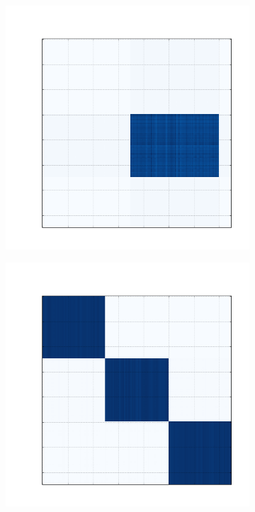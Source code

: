 \documentclass[
    12pt,                %
    oneside,            %
    a4paper,            %
    english,            %
    brazil                %
    ]{abntex2ppgsi}
\begin{document}
\begin{figure}[H]
    \begin{subfigure}[b]{0.18\textwidth}
        \includegraphics[width=\textwidth]{img/a-reconstruction-ovnmtf.png}
        \caption{}
    \end{subfigure}
    \begin{subfigure}[b]{0.18\textwidth}
        \includegraphics[width=\textwidth]{img/b-reconstruction-ovnmtf.png}

\end{subfigure}
\end{figure}
\end{document}
